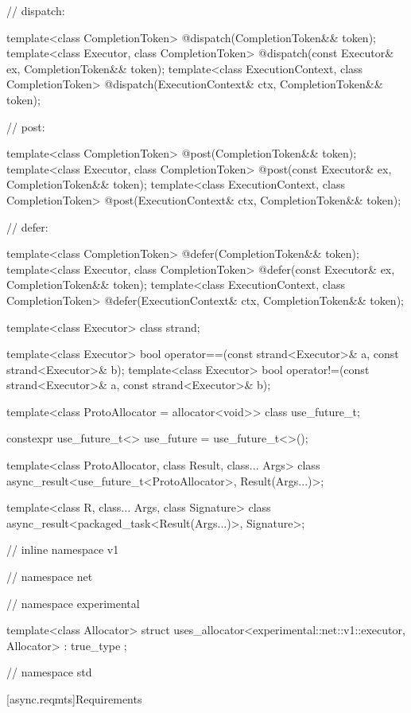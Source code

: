 \begin{codeblock}
{{{{  // dispatch:

  template<class CompletionToken>
    @\DEDUCED@ dispatch(CompletionToken&& token);
  template<class Executor, class CompletionToken>
    @\DEDUCED@ dispatch(const Executor& ex, CompletionToken&& token);
  template<class ExecutionContext, class CompletionToken>
    @\DEDUCED@ dispatch(ExecutionContext& ctx, CompletionToken&& token);

  // post:

  template<class CompletionToken>
    @\DEDUCED@ post(CompletionToken&& token);
  template<class Executor, class CompletionToken>
    @\DEDUCED@ post(const Executor& ex, CompletionToken&& token);
  template<class ExecutionContext, class CompletionToken>
    @\DEDUCED@ post(ExecutionContext& ctx, CompletionToken&& token);

  // defer:

  template<class CompletionToken>
    @\DEDUCED@ defer(CompletionToken&& token);
  template<class Executor, class CompletionToken>
    @\DEDUCED@ defer(const Executor& ex, CompletionToken&& token);
  template<class ExecutionContext, class CompletionToken>
    @\DEDUCED@ defer(ExecutionContext& ctx, CompletionToken&& token);

  template<class Executor>
    class strand;

  template<class Executor>
    bool operator==(const strand<Executor>& a, const strand<Executor>& b);
  template<class Executor>
    bool operator!=(const strand<Executor>& a, const strand<Executor>& b);

  template<class ProtoAllocator = allocator<void>>
    class use_future_t;

  constexpr use_future_t<> use_future = use_future_t<>();

  template<class ProtoAllocator, class Result, class... Args>
    class async_result<use_future_t<ProtoAllocator>, Result(Args...)>;

  template<class R, class... Args, class Signature>
    class async_result<packaged_task<Result(Args...)>, Signature>;

} // inline namespace v1
} // namespace net
} // namespace experimental

  template<class Allocator>
    struct uses_allocator<experimental::net::v1::executor, Allocator>
      : true_type {};

} // namespace std
\end{codeblock}



[async.reqmts]{Requirements}


